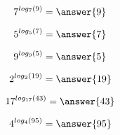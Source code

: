 \documentclass{ximera}
\author{Lee Wayand}
\begin{document}
\begin{example}













\[
7^{log_7(9)} = \answer{9}
\]




\[
5^{log_5(7)} = \answer{7}
\]




\[
9^{log_9(5)} = \answer{5}
\]








\[
2^{log_2(19)} = \answer{19}
\]




\[
17^{log_{17}(43)} = \answer{43}
\]




\[
4^{log_4(95)} = \answer{95}
\]























\end{example}
\end{document}
